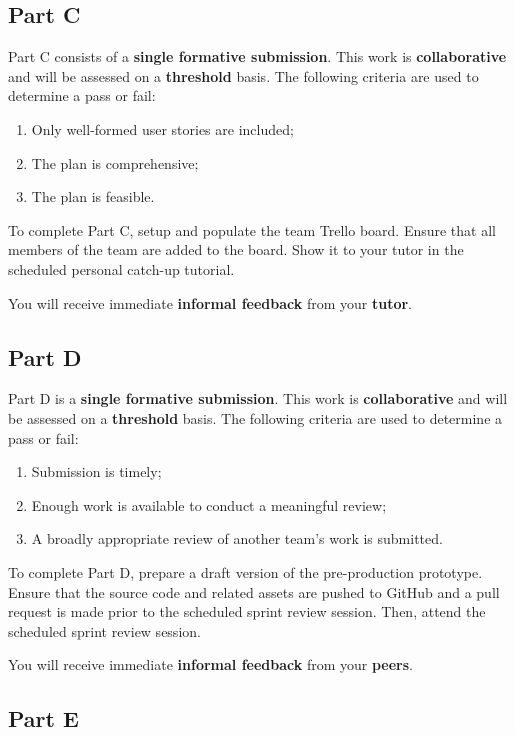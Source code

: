 \documentclass{../fal_assignment}
\begin{document}
\subsection*{Part C}

Part C consists of a \textbf{single formative submission}. This work is \textbf{collaborative} and will be assessed on a \textbf{threshold} basis. The following criteria are used to determine a pass or fail:

\begin{enumerate}[label=(\alph*)]
	\item Only well-formed user stories are included;
	\item The plan is comprehensive;
	\item The plan is feasible.
\end{enumerate}

To complete Part C, setup and populate the team Trello board. Ensure that all members of the team are added to the board. Show it to your tutor in the scheduled personal catch-up tutorial.

You will receive immediate \textbf{informal feedback} from your \textbf{tutor}.

\subsection*{Part D}

Part D is a \textbf{single formative submission}. This work is \textbf{collaborative} and will be assessed on a \textbf{threshold} basis. The following criteria are used to determine a pass or fail:

\begin{enumerate}[label=(\alph*)]
	\item Submission is timely;
	\item Enough work is available to conduct a meaningful review;
	\item A broadly appropriate review of another team's work is submitted.
\end{enumerate}

To complete Part D, prepare a draft version of the pre-production prototype. Ensure that the source code and related assets are pushed to GitHub and a pull request is made prior to the scheduled sprint review session. Then, attend the scheduled sprint review session.

You will receive immediate \textbf{informal feedback} from your \textbf{peers}.

\subsection*{Part E}
\end{document}
